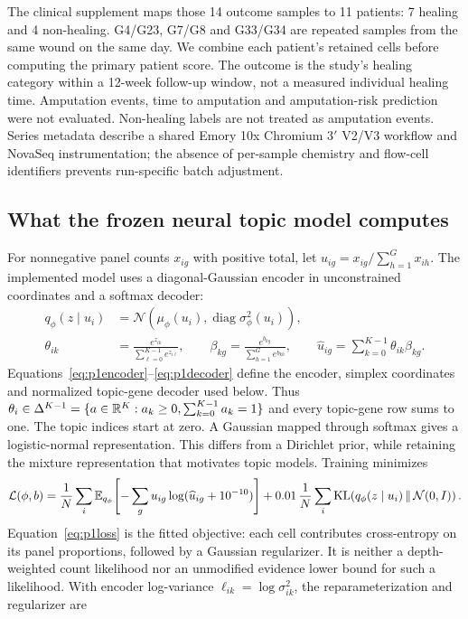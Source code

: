 \documentclass[10pt,a4paper]{article}
\begin{document}
The clinical supplement maps those 14 outcome samples to 11 patients: 7 healing and 4 non-healing. G4/G23, G7/G8 and G33/G34 are repeated samples from the same wound on the same day. We combine each patient's retained cells before computing the primary patient score. The outcome is the study's healing category within a 12-week follow-up window, not a measured individual healing time. Amputation events, time to amputation and amputation-risk prediction were not evaluated. Non-healing labels are not treated as amputation events. Series metadata describe a shared Emory 10x Chromium 3$'$ V2/V3 workflow and NovaSeq instrumentation; the absence of per-sample chemistry and flow-cell identifiers prevents run-specific batch adjustment.

\subsection{What the frozen neural topic model computes}
For nonnegative panel counts $x_{ig}$ with positive total, let $u_{ig}=x_{ig}/\sum_{h=1}^{G}x_{ih}$. The implemented model uses a diagonal-Gaussian encoder in unconstrained coordinates and a softmax decoder:
\begin{align}
q_\phi(z\mid u_i)&=\mathcal N\!\left(\mu_\phi(u_i),\operatorname{diag}\sigma_\phi^2(u_i)\right),\label{eq:p1encoder}\\
\theta_{ik}&=\frac{e^{z_{ik}}}{\sum_{\ell=0}^{K-1}e^{z_{i\ell}}},\qquad
\beta_{kg}=\frac{e^{b_{kg}}}{\sum_{h=1}^{G}e^{b_{kh}}},\qquad
\widehat u_{ig}=\sum_{k=0}^{K-1}\theta_{ik}\beta_{kg}.\label{eq:p1decoder}
\end{align}
Equations~\eqref{eq:p1encoder}--\eqref{eq:p1decoder} define the encoder, simplex coordinates and normalized topic-gene decoder used below. Thus $\theta_i\in\Delta^{K-1}=\{a\in\mathbb{R}^K:a_k\geq0,\sum_{k=0}^{K-1}a_k=1\}$ and every topic-gene row sums to one. The topic indices start at zero. A Gaussian mapped through softmax gives a logistic-normal representation. This differs from a Dirichlet prior, while retaining the mixture representation that motivates topic models. Training minimizes
\begin{equation}
\mathcal L(\phi,b)=\frac1N\sum_i\mathbb{E}_{q_\phi}\!\left[-\sum_g u_{ig}\log(\widehat u_{ig}+10^{-10})\right]
+0.01\,\frac1N\sum_i\operatorname{KL}\!\left(q_\phi(z\mid u_i)\,\|\,\mathcal N(0,I)\right).\label{eq:p1loss}
\end{equation}
Equation~\eqref{eq:p1loss} is the fitted objective: each cell contributes cross-entropy on its panel proportions, followed by a Gaussian regularizer. It is neither a depth-weighted count likelihood nor an unmodified evidence lower bound for such a likelihood. With encoder log-variance $\ell_{ik}=\log\sigma_{ik}^2$, the reparameterization and regularizer are
\end{document}
